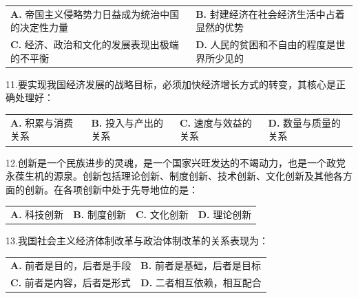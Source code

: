\documentclass[UTF8,11pt]{ctexart}
\begin{document}
\begin{center}\begin{tabular}{>{\raggedright\arraybackslash}p{\dimexpr(\linewidth-4\tabcolsep)/2\relax}>{\raggedright\arraybackslash}p{\dimexpr(\linewidth-4\tabcolsep)/2\relax}}
\textbf{A.} 帝国主义侵略势力日益成为统治中国的决定性力量 & \textbf{B.} 封建经济在社会经济生活中占着显然的优势\\[.35em]
\textbf{C.} 经济、政治和文化的发展表现出极端的不平衡 & \textbf{D.} 人民的贫困和不自由的程度是世界所少见的\\[.35em]\end{tabular}\end{center}

11.要实现我国经济发展的战略目标，必须加快经济增长方式的转变，其核心是正确处理好：


\begin{center}\begin{tabular}{>{\raggedright\arraybackslash}p{\dimexpr(\linewidth-8\tabcolsep)/4\relax}>{\raggedright\arraybackslash}p{\dimexpr(\linewidth-8\tabcolsep)/4\relax}>{\raggedright\arraybackslash}p{\dimexpr(\linewidth-8\tabcolsep)/4\relax}>{\raggedright\arraybackslash}p{\dimexpr(\linewidth-8\tabcolsep)/4\relax}}
\textbf{A.} 积累与消费关系 & \textbf{B.} 投入与产出的关系 & \textbf{C.} 速度与效益的关系 & \textbf{D.} 数量与质量的关系\\[.35em]\end{tabular}\end{center}

12.创新是一个民族进步的灵魂，是一个国家兴旺发达的不竭动力，也是一个政党永葆生机的源泉。创新包括理论创新、制度创新、技术创新、文化创新及其他各方面的创新。在各项创新中处于先导地位的是：


\begin{center}\begin{tabular}{>{\raggedright\arraybackslash}p{\dimexpr(\linewidth-8\tabcolsep)/4\relax}>{\raggedright\arraybackslash}p{\dimexpr(\linewidth-8\tabcolsep)/4\relax}>{\raggedright\arraybackslash}p{\dimexpr(\linewidth-8\tabcolsep)/4\relax}>{\raggedright\arraybackslash}p{\dimexpr(\linewidth-8\tabcolsep)/4\relax}}
\textbf{A.} 科技创新 & \textbf{B.} 制度创新 & \textbf{C.} 文化创新 & \textbf{D.} 理论创新\\[.35em]\end{tabular}\end{center}

13.我国社会主义经济体制改革与政治体制改革的关系表现为：


\begin{center}\begin{tabular}{>{\raggedright\arraybackslash}p{\dimexpr(\linewidth-4\tabcolsep)/2\relax}>{\raggedright\arraybackslash}p{\dimexpr(\linewidth-4\tabcolsep)/2\relax}}
\textbf{A.} 前者是目的，后者是手段 & \textbf{B.} 前者是基础，后者是目标\\[.35em]
\textbf{C.} 前者是内容，后者是形式 & \textbf{D.} 二者相互依赖，相互配合\\[.35em]\end{tabular}\end{center}
\end{document}
